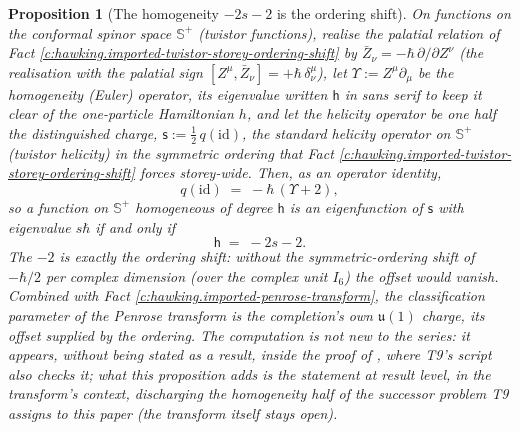 \documentclass[11pt]{article}
\newtheorem{proposition}[theorem]{Proposition}
\theoremstyle{definition}
\theoremstyle{plain}
\newcommand{\changedmark}[2]{\marginpar{\raggedright\scriptsize\color{#1}#2}}
\providecommand{\CS}{}\renewcommand{\CS}{{\mathbb{S}^{+}}}
\providecommand{\id}{}\renewcommand{\id}{\mathrm{id}}
\begin{document}
\begin{proposition}[The homogeneity $-2s-2$ is the ordering shift]\label{c:hawking.homogeneity-ordering-shift}
\changedmark{gray}{reworded}
On functions on the conformal spinor space $\CS$ (twistor functions), realise the palatial relation of Fact \ref{c:hawking.imported-twistor-storey-ordering-shift} by $\bar Z_\nu = -\hbar\,\partial/\partial Z^\nu$ (the realisation with the palatial sign $[Z^\mu, \bar Z_\nu] = +\hbar\,\delta^\mu_\nu$), let $\Upsilon := Z^\mu \partial_\mu$ be the homogeneity (Euler) operator, its eigenvalue written $\mathsf{h}$ in sans serif to keep it clear of the one-particle Hamiltonian $h$, and let the helicity operator be one half the distinguished charge, $\mathsf{s} := \tfrac12\, q(\id)$, the standard helicity operator on $\CS$ (twistor helicity) \cite{Penrose1969, EPW1981} in the symmetric ordering that Fact \ref{c:hawking.imported-twistor-storey-ordering-shift} forces storey-wide. Then, as an operator identity,
\[
q(\id) \;=\; -\hbar\,(\Upsilon + 2),
\]
so a function on $\CS$ homogeneous of degree $\mathsf{h}$ is an eigenfunction of $\mathsf{s}$ with eigenvalue $s\hbar$ if and only if
\[
\mathsf{h} \;=\; -2s - 2.
\]
The $-2$ is exactly the ordering shift: without the symmetric-ordering shift of $-\hbar/2$ per complex dimension (over the complex unit $I_6$) the offset would vanish. Combined with Fact \ref{c:hawking.imported-penrose-transform}, the classification parameter of the Penrose transform is the completion's own $\mathfrak{u}(1)$ charge, its offset supplied by the ordering. The computation is not new to the series: it appears, without being stated as a result, inside the proof of \cite[Thm.~5.7]{ButlerT9}, where T9's script also checks it; what this proposition adds is the statement at result level, in the transform's context, discharging the homogeneity half of the successor problem T9 assigns to this paper (the transform itself stays open).
\end{proposition}
\end{document}
